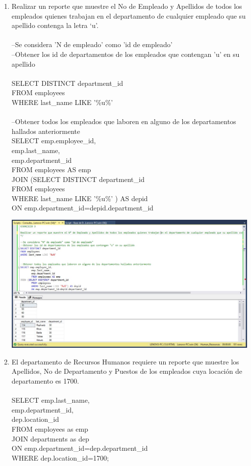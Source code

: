 \begin{enumerate}[1.]
	\item Realizar un reporte que muestre el No de Empleado y Apellidos de todos los empleados quienes trabajan en el departamento de cualquier empleado que su apellido contenga la letra ‘u’.
	\\
\\--Se considera 'N de empleado' como 'id de empleado'
\\--Obtener los id de departamentos de los empleados que contengan 'u' en su apellido
\\
\\SELECT DISTINCT department\_id
\\FROM employees
\\WHERE last\_name LIKE '\%u\%'
\\
\\--Obtener todos los empleados que laboren en alguno de los departamentos hallados anteriormente
\\SELECT emp.employee\_id,
\\		emp.last\_name,
\\		emp.department\_id
\\		FROM employees AS emp
\\JOIN (SELECT DISTINCT department\_id
\\		FROM employees
\\		WHERE last\_name LIKE '\%u\%' ) AS depid
\\		ON emp.department\_id=depid.department\_id\\

	\begin{center}
	\includegraphics[width=17cm]{./Imagenes/Actividad9-Ejercicio03} 
	\end{center}

	\item El departamento de Recursos Humanos requiere un reporte que muestre los Apellidos, No de Departamento y Puestos de los empleados cuya locación de departamento es 1700.
	\\
\\SELECT emp.last\_name,
\\		emp.department\_id,
\\		dep.location\_id
\\		FROM employees as emp
\\JOIN departments as dep
\\	ON emp.department\_id=dep.department\_id
\\	WHERE dep.location\_id=1700;\\


\end{enumerate}
